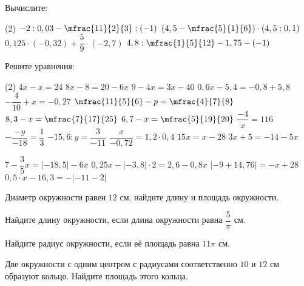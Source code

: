 \begin{class}[number=7-8]
	\begin{listofex}
		\item Вычислите:
		\begin{tasks}(2)
			\task \( -2:0,03 - \mfrac{ 11 }{2  }{3}:(-1) \)
			\task \( \left( 4,5-\mfrac{ 5 }{ 1 }{6} \right) \cdot (4,5:0,1) \)
			\task \( 0,125 \cdot (-0,32)+\dfrac{ 5 }{ 9 } \cdot (-2,7) \)
			\task \( 4,8:\mfrac{ 1 }{ 5 }{12}-1,75-(-1) \)
		\end{tasks}
		\item Решите уравнения: %
		\begin{tasks}(2)
			\task \( 4x-x=24 \)
			\task \( 8x-8=20-6x \)
			\task \( 9-4x=3x-40 \)
			\task \( 0,6x-5,4=-0,8+5,8 \)
			\task \( -\dfrac{4}{10}+x=-0,27 \)
			\task \( \mfrac{11}{5}{6}-p=\mfrac{4}{7}{8} \)
			\task \( 8,3-x=\mfrac{7}{17}{25} \)
			\task \( 6,7-x=\mfrac{5}{19}{20} \)
			\task \( \dfrac{-4}{x}=116 \)
			\task \( -\dfrac{-y}{-18}=\dfrac{1}{3} \)
			\task \( -15,6:y=\dfrac{3}{-11} \)
			\task \( \dfrac{x}{-0,72}=1,2 \cdot 0,4 \)
			\task \( 15x=x-28 \)
			\task \( 3x+5=-14-5x \)
			
			\task \( 7-\dfrac{3}{5}x=|-18,5|-6x \)
			\task \( 0,25x-|-3,8| \cdot 2 = 2,6 - 0,8x \)
			\task \( |-9 + 14,76| = -x+28 \)
			\task \( 0,5 \cdot x-16,3=- |-11-2| \)
			
		\end{tasks}
		\item Диаметр окружности равен \(12\) см, найдите длину и площадь окружности.
		\item Найдите длину окружности, если длина окружности равна \(\dfrac{ 5 }{ \pi }\) см.
		\item Найдите радиус окружности, если её площадь равна \( 11\pi \) см.
		\item Две окружности с одним центром с радиусами соответственно \( 10\) и \(12\) см образуют кольцо. Найдите площадь этого кольца.
	\end{listofex}
\end{class}

